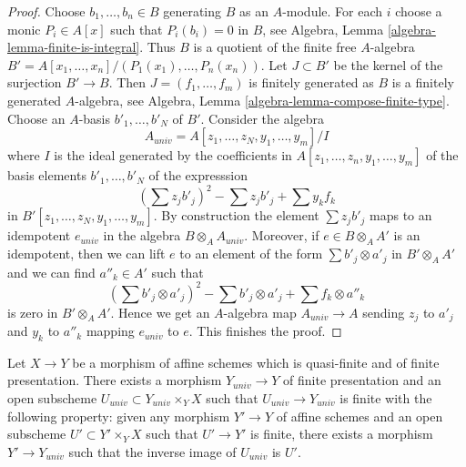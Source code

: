 \begin{proof}
Choose $b_1, \ldots, b_n \in B$ generating $B$ as an $A$-module.
For each $i$ choose a monic $P_i \in A[x]$ such that $P_i(b_i) = 0$
in $B$, see Algebra, Lemma \ref{algebra-lemma-finite-is-integral}.
Thus $B$ is a quotient of the finite free $A$-algebra
$B' = A[x_1, \ldots, x_n]/(P_1(x_1), \ldots, P_n(x_n))$.
Let $J \subset B'$ be the kernel of the surjection $B' \to B$.
Then $J =(f_1, \ldots, f_m)$ is finitely generated as $B$
is a finitely generated $A$-algebra, see
Algebra, Lemma \ref{algebra-lemma-compose-finite-type}.
Choose an $A$-basis $b'_1, \ldots, b'_N$ of $B'$.
Consider the algebra
$$
A_{univ} = A[z_1, \ldots, z_N, y_1, \ldots, y_m]/I
$$
where $I$ is the ideal generated by the coefficients in
$A[z_1, \ldots, z_n, y_1, \ldots, y_m]$
of the basis elements $b'_1, \ldots, b'_N$ of the expresssion
$$
(\sum z_j b'_j)^2 - \sum z_j b'_j + \sum y_k f_k
$$
in $B'[z_1, \ldots, z_N, y_1, \ldots, y_m]$. By construction
the element $\sum z_j b'_j$ maps to an idempotent $e_{univ}$ in the
algebra $B \otimes_A A_{univ}$. Moreover, if $e \in B \otimes_A A'$
is an idempotent, then we can lift $e$ to an element of the form
$\sum b'_j \otimes a'_j$ in $B' \otimes_A A'$ and we can find
$a''_k \in A'$ such that
$$
(\sum b'_j \otimes a'_j)^2 - \sum b'_j \otimes a'_j + \sum f_k \otimes a''_k
$$
is zero in $B' \otimes_A A'$. Hence we get an $A$-algebra map
$A_{univ} \to A$ sending $z_j$ to $a'_j$ and $y_k$ to $a''_k$
mapping $e_{univ}$ to $e$. This finishes the proof.
\end{proof}

\begin{lemma}
\label{lemma-open-and-closed-in-quasi-finite}
Let $X \to Y$ be a morphism of affine schemes which is quasi-finite and
of finite presentation. There exists a morphism $Y_{univ} \to Y$
of finite presentation and an open subscheme
$U_{univ} \subset Y_{univ} \times_Y X$ such that
$U_{univ} \to Y_{univ}$ is finite with the following property:
given any morphism $Y' \to Y$ of affine schemes
and an open subscheme $U' \subset Y' \times_Y X$
such that $U' \to Y'$ is finite, there exists a morphism
$Y' \to Y_{univ}$ such that the inverse image of $U_{univ}$ is $U'$.
\end{lemma}

